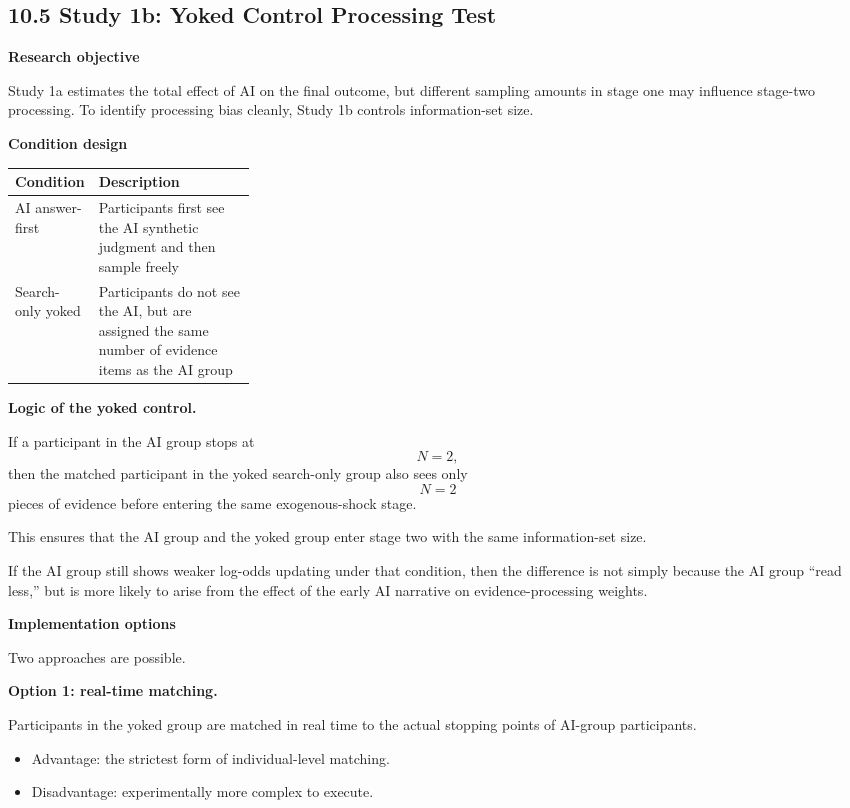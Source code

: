 \subsection*{10.5 Study 1b: Yoked Control Processing Test}

\textbf{Research objective}

Study 1a estimates the total effect of AI on the final outcome, but different sampling amounts in stage one may influence stage-two processing. To identify processing bias cleanly, Study 1b controls information-set size.

\textbf{Condition design}

\begin{center}
\begin{tabularx}{\linewidth}{>{\raggedright\arraybackslash}p{0.28\linewidth} >{\raggedright\arraybackslash}X}
\toprule
\textbf{Condition} & \textbf{Description} \\
\midrule
AI answer-first & Participants first see the AI synthetic judgment and then sample freely \\
Search-only yoked & Participants do not see the AI, but are assigned the same number of evidence items as the AI group \\
\bottomrule
\end{tabularx}
\end{center}

\textbf{Logic of the yoked control.}

If a participant in the AI group stops at
\[
N = 2,
\]
then the matched participant in the yoked search-only group also sees only
\[
N = 2
\]
pieces of evidence before entering the same exogenous-shock stage.

This ensures that the AI group and the yoked group enter stage two with the same information-set size.

If the AI group still shows weaker log-odds updating under that condition, then the difference is not simply because the AI group ``read less,'' but is more likely to arise from the effect of the early AI narrative on evidence-processing weights.

\textbf{Implementation options}

Two approaches are possible.

\textbf{Option 1: real-time matching.}

Participants in the yoked group are matched in real time to the actual stopping points of AI-group participants.
\begin{itemize}[leftmargin=1.5em]
\item Advantage: the strictest form of individual-level matching.
\item Disadvantage: experimentally more complex to execute.
\end{itemize}

